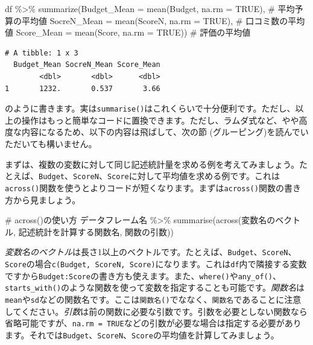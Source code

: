 \documentclass[
  a4paper,
  pandoc,
  ja=standard,
  jafont=haranoaji]{bxjsbook}
\newenvironment{Shaded}{\begin{snugshade}}{\end{snugshade}}
\newcommand{\AttributeTok}[1]{\textcolor[rgb]{0.00,0.48,0.65}{#1}}
\newcommand{\CommentTok}[1]{\textcolor[rgb]{0.37,0.37,0.37}{#1}}
\newcommand{\ConstantTok}[1]{\textcolor[rgb]{0.56,0.35,0.01}{#1}}
\newcommand{\FunctionTok}[1]{\textcolor[rgb]{0.28,0.35,0.67}{#1}}
\newcommand{\NormalTok}[1]{\textcolor[rgb]{0.00,0.48,0.65}{#1}}
\newcommand{\SpecialCharTok}[1]{\textcolor[rgb]{0.37,0.37,0.37}{#1}}
\begin{document}
\begin{Shaded}
\begin{Highlighting}[numbers=left,,]
\NormalTok{df }\SpecialCharTok{\%\textgreater{}\%}
  \FunctionTok{summarize}\NormalTok{(}\AttributeTok{Budget\_Mean =} \FunctionTok{mean}\NormalTok{(Budget, }\AttributeTok{na.rm =} \ConstantTok{TRUE}\NormalTok{), }\CommentTok{\# 平均予算の平均値}
            \AttributeTok{SocreN\_Mean =} \FunctionTok{mean}\NormalTok{(ScoreN, }\AttributeTok{na.rm =} \ConstantTok{TRUE}\NormalTok{), }\CommentTok{\# 口コミ数の平均値}
            \AttributeTok{Score\_Mean  =} \FunctionTok{mean}\NormalTok{(Score,  }\AttributeTok{na.rm =} \ConstantTok{TRUE}\NormalTok{)) }\CommentTok{\# 評価の平均値}
\end{Highlighting}
\end{Shaded}

\begin{verbatim}
# A tibble: 1 x 3
  Budget_Mean SocreN_Mean Score_Mean
        <dbl>       <dbl>      <dbl>
1       1232.       0.537       3.66
\end{verbatim}

のように書きます。実は\texttt{summarise()}はこれくらいで十分便利です。ただし、以上の操作はもっと簡単なコードに置換できます。ただし、ラムダ式など、やや高度な内容になるため、以下の内容は飛ばして、次の節
(グルーピング)を読んでいただいても構いません。

まずは、複数の変数に対して同じ記述統計量を求める例を考えてみましょう。たとえば、\texttt{Budget}、\texttt{ScoreN}、\texttt{Score}に対して平均値を求める例です。これは\texttt{across()}関数を使うとよりコードが短くなります。まずは\texttt{across()}関数の書き方から見ましょう。

\begin{Shaded}
\begin{Highlighting}[numbers=left,,]
\CommentTok{\# across()の使い方}
\NormalTok{データフレーム名 }\SpecialCharTok{\%\textgreater{}\%}
  \FunctionTok{summarise}\NormalTok{(}\FunctionTok{across}\NormalTok{(変数名のベクトル, 記述統計を計算する関数名, 関数の引数))}
\end{Highlighting}
\end{Shaded}

\emph{変数名のベクトル}は長さ1以上のベクトルです。たとえば、\texttt{Budget}、\texttt{ScoreN}、\texttt{Score}の場合\texttt{c(Budget,\ ScoreN,\ Score)}になります。これは\texttt{df}内で隣接する変数ですから\texttt{Budget:Score}の書き方も使えます。また、\texttt{where()}や\texttt{any\_of()}、\texttt{starts\_with()}のような関数を使って変数を指定することも可能です。\emph{関数名}は\texttt{mean}や\texttt{sd}などの関数名です。ここは\texttt{関数名()}でななく、\texttt{関数名}であることに注意してください。\emph{引数}は前の関数に必要な引数です。引数を必要としない関数なら省略可能ですが、\texttt{na.rm\ =\ TRUE}などの引数が必要な場合は指定する必要があります。それでは\texttt{Budget}、\texttt{ScoreN}、\texttt{Score}の平均値を計算してみましょう。
\end{document}
